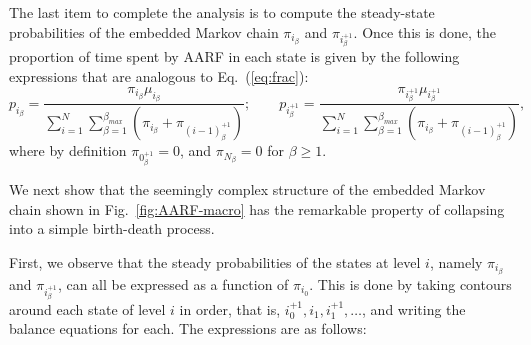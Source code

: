 \documentclass[11pt, journal, letterpaper, oneside, onecolumn]{IEEEtran}
\begin{document}
The last item to complete the analysis is to compute the
steady-state probabilities of the embedded Markov chain
$\pi_{i_{\beta}}$ and $\pi_{i^{+1}_{\beta}}$.  Once this is done,
the proportion of time spent by AARF in each state is given by the
following expressions that are analogous to Eq.~(\ref{eq:frac}):
\begin{equation}\label{eq:pfallback_AARF}
p_{i_{\beta}}=\frac{\pi_{i_{\beta}}\mu_{i_{\beta}}}{\sum_{i=1}^{N}{\sum_{\beta=1}^{\beta_{max}}{(\pi_{i_{\beta}}+\pi_{(i-1)^{+1}_{\beta}})}}}; \qquad
p_{i^{+1}_{\beta}}=\frac{\pi_{i^{+1}_{\beta}}\mu_{i^{+1}_{\beta}}}{\sum_{i=1}^{N}{\sum_{\beta=1}^{\beta_{max}}{(\pi_{i_{\beta}}+\pi_{(i-1)^{+1}_{\beta}})}}},
\end{equation}
where by definition $\pi_{{0}^{+1}_{\beta}}=0$, and
$\pi_{N_{\beta}}=0$ for $\beta \geq 1$.







We next show that the seemingly complex structure of the embedded
Markov chain shown in Fig.~\ref{fig:AARF-macro} has the remarkable
property of collapsing into a simple birth-death process.

First, we observe that the steady probabilities of the states at
level $i$, namely $\pi_{i_{\beta}}$ and $\pi_{i^{+1}_{\beta}}$,
can all be expressed as a function of $\pi_{i_{0}}$. This is done
by taking contours around each state of level $i$ in order, that
is, $i^{+1}_{0}, i_{1}, i^{+1}_{1}, \ldots$, and writing the
balance equations for each. The expressions are as follows:
\end{document}
